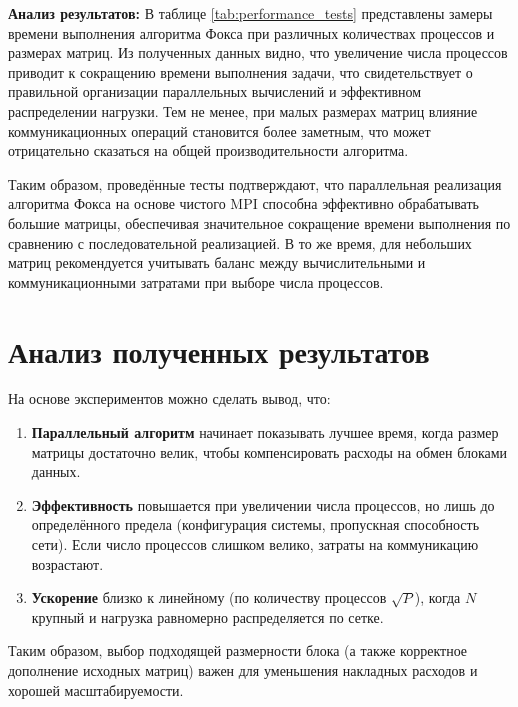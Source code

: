 \documentclass{report}
\begin{document}
\textbf{Анализ результатов:} В таблице \ref{tab:performance_tests} представлены замеры времени выполнения алгоритма Фокса при различных количествах процессов и размерах матриц. Из полученных данных видно, что увеличение числа процессов приводит к сокращению времени выполнения задачи, что свидетельствует о правильной организации параллельных вычислений и эффективном распределении нагрузки. Тем не менее, при малых размерах матриц влияние коммуникационных операций становится более заметным, что может отрицательно сказаться на общей производительности алгоритма.

Таким образом, проведённые тесты подтверждают, что параллельная реализация алгоритма Фокса на основе чистого MPI способна эффективно обрабатывать большие матрицы, обеспечивая значительное сокращение времени выполнения по сравнению с последовательной реализацией. В то же время, для небольших матриц рекомендуется учитывать баланс между вычислительными и коммуникационными затратами при выборе числа процессов.

\newpage

\section*{Анализ полученных результатов}

На основе экспериментов можно сделать вывод, что:

\begin{enumerate}
    \item \textbf{Параллельный алгоритм} начинает показывать лучшее время, когда размер матрицы достаточно велик, чтобы компенсировать расходы на обмен блоками данных.
    
    \item \textbf{Эффективность} повышается при увеличении числа процессов, но лишь до определённого предела (конфигурация системы, пропускная способность сети). Если число процессов слишком велико, затраты на коммуникацию возрастают.
    
    \item \textbf{Ускорение} близко к линейному (по количеству процессов $\sqrt{P}$), когда $N$ крупный и нагрузка равномерно распределяется по сетке.  
\end{enumerate}

Таким образом, выбор подходящей размерности блока (а также корректное дополнение исходных матриц) важен для уменьшения накладных расходов и хорошей масштабируемости.
\end{document}
